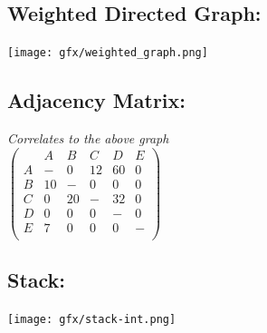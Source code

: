 	\subsection{Weighted Directed Graph:}
	\begin{center}
		\texttt{[image: gfx/weighted\_graph.png]}
	\end{center}
	\subsection{Adjacency Matrix:}
	\begin{center}
		\emph{Correlates to the above graph} \\[5mm]
		$\begin{pmatrix}
			  & A & B & C & D & E\\
			A & - & 0 & 12 & 60 & 0\\
			B & 10 & - & 0 & 0 & 0\\
			C & 0 & 20 & - & 32 & 0\\
			D & 0 & 0 & 0 & - & 0\\
			E & 7 & 0 & 0 & 0 & -\\
		\end{pmatrix}$
	\end{center}
	\subsection{Stack:}
	\begin{center}
		\texttt{[image: gfx/stack-int.png]}
	\end{center}
